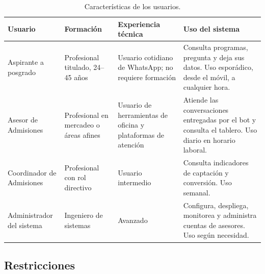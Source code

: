 \documentclass[12pt,a4paper]{report}
\newcommand{\tablacompacta}{\setstretch{1.1}\small}
\newcommand{\cabecera}[1]{\rowcolor{filacabecera}#1}
\begin{document}
\begin{table}[H]
    \centering
    \tablacompacta
    \begin{tabularx}{\textwidth}{p{2.7cm}p{2.4cm}p{2.2cm}X}
        \toprule
        \cabecera{\textbf{Usuario}} & \textbf{Formación} & \textbf{Experiencia técnica} & \textbf{Uso del sistema} \\
        \midrule
        Aspirante a posgrado & Profesional titulado, 24--45 años & Usuario cotidiano de WhatsApp; no requiere formación & Consulta programas, pregunta y deja sus datos. Uso esporádico, desde el móvil, a cualquier hora. \\[0.2cm]
        Asesor de Admisiones & Profesional en mercadeo o áreas afines & Usuario de herramientas de oficina y plataformas de atención & Atiende las conversaciones entregadas por el bot y consulta el tablero. Uso diario en horario laboral. \\[0.2cm]
        Coordinador de Admisiones & Profesional con rol directivo & Usuario intermedio & Consulta indicadores de captación y conversión. Uso semanal. \\[0.2cm]
        Administrador del sistema & Ingeniero de sistemas & Avanzado & Configura, despliega, monitorea y administra cuentas de asesores. Uso según necesidad. \\
        \bottomrule
    \end{tabularx}
    \caption{Características de los usuarios.}
\end{table}

\subsection{Restricciones}
\end{document}
